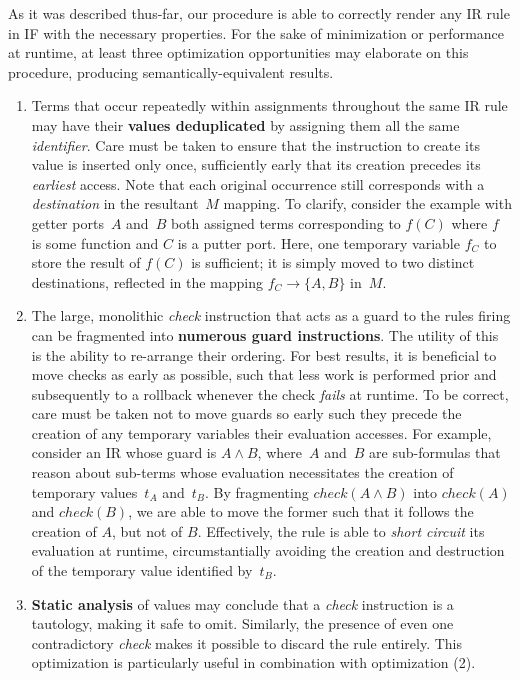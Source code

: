 As it was described thus-far, our procedure is able to correctly render any IR rule in IF with the necessary properties. For the sake of minimization or performance at runtime, at least three optimization opportunities may elaborate on this procedure, producing semantically-equivalent results.

\begin{enumerate}
	\item Terms that occur repeatedly within assignments throughout the same IR rule may have their \textbf{values deduplicated} by assigning them all the same \textit{identifier}. Care must be taken to ensure that the instruction to create its value is inserted only once, sufficiently early that its creation precedes its \textit{earliest} access. Note that each original occurrence still corresponds with a \textit{destination} in the resultant~$M$ mapping. To clarify, consider the example with getter ports~$A$ and~$B$ both assigned terms corresponding to $f(C)$ where $f$ is some function and $C$ is a putter port. Here, one temporary variable $f_C$ to store the result of $f(C)$ is sufficient; it is simply moved to two distinct destinations, reflected in the mapping $f_C\rightarrow\{A,B\}$ in~$M$.
	
	\item The large, monolithic \textit{check} instruction that acts as a guard to the rules firing can be fragmented into \textbf{numerous guard instructions}. The utility of this is the ability to re-arrange their ordering. For best results, it is beneficial to move checks as early as possible, such that less work is performed prior and subsequently to a rollback whenever the check \textit{fails} at runtime. To be correct, care must be taken not to move guards so early such they precede the creation of any temporary variables their evaluation accesses. For example, consider an IR 
	whose guard is $A\wedge{}B$, where~$A$ and~$B$ are sub-formulas that reason about sub-terms whose evaluation necessitates the creation of temporary values~$t_A$ and~$t_B$. By fragmenting $check(A\wedge{}B)$ into $check(A)$ and $check(B)$, we are able to move the former such that it follows the creation of $A$, but not of $B$. Effectively, the rule is able to \textit{short circuit} its evaluation at runtime, circumstantially avoiding the creation and destruction of the temporary value identified by~$t_B$.
	
	\item \textbf{Static analysis} of values may conclude that a \textit{check} instruction is a tautology, making it safe to omit. Similarly, the presence of even one contradictory \textit{check} makes it possible to discard the rule entirely. This optimization is particularly useful in combination with optimization (2).
\end{enumerate}

